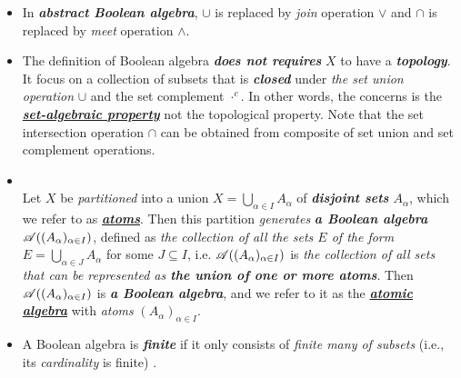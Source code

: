 \documentclass[11pt]{article}
\begin{document}
\begin{itemize}
\item \begin{remark}
In \emph{\textbf{abstract Boolean algebra}}, $\cup$ is replaced by \emph{join} operation $\lor$ and $\cap$ is replaced by \emph{meet} operation $\land$.
\end{remark}

\item \begin{remark}
The definition of Boolean algebra \emph{\textbf{does not requires}} $X$ to have a \emph{\textbf{topology}}. It focus on a collection of subsets that is \emph{\textbf{closed}} under \emph{the set union operation} $\cup$ and the set complement $\cdot^c$. In other words, the concerns is the \underline{\emph{\textbf{set-algebraic property}}} not the topological property. Note that the set intersection operation $\cap$ can be obtained from composite of set union and set complement operations.
\end{remark}

\item 
\begin{definition} \citep{tao2011introduction}\\
Let $X$ be \emph{partitioned} into a union $X= \bigcup_{\alpha\in I}A_{\alpha}$ of \emph{\textbf{disjoint sets} $A_{\alpha}$}, which we refer to as \underline{\emph{\textbf{atoms}}}. Then this partition \emph{generates} \emph{\textbf{a Boolean algebra}} ${\mathscr A}((A_{\alpha})_{\alpha\in I} )$, defined as \emph{the collection of all the sets $E$ of the form \underline{$E =\bigcup_{\alpha\in J}A_{\alpha}$}} for some $J \subseteq I$, i.e. ${\mathscr A}((A_{\alpha})_{\alpha\in I} )$ is \emph{the collection of all sets that can be represented as \textbf{the union of one or more atoms}}. Then ${\mathscr A}((A_{\alpha})_{\alpha\in I} )$ is \emph{\textbf{a Boolean algebra}}, and we refer to it as the \underline{\emph{\textbf{atomic algebra}}} with \emph{atoms} $(A_{\alpha})_{\alpha\in I}$.
\end{definition}

\item \begin{definition}
A Boolean algebra is \emph{\textbf{finite}} if it only consists of \emph{finite many of subsets} (i.e., its \emph{cardinality} is finite)  \citep{tao2011introduction}.  
\end{definition}


\end{itemize}
\end{document}
